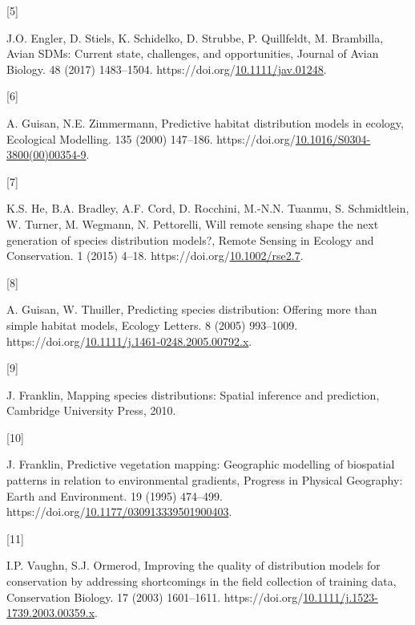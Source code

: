 \documentclass[manuscript, 3p, authoryear]{elsarticle} %
\newlength{\cslhangindent}
\newlength{\csllabelwidth}
\newlength{\cslentryspacingunit} %
\newenvironment{CSLReferences}[2] %
 {%
  \setlength{\parindent}{0pt}
  \ifodd #1
  \let\oldpar\par
  \def\par{\hangindent=\cslhangindent\oldpar}
  \fi
  \setlength{\parskip}{#2\cslentryspacingunit}
 }%
 {}
\newcommand{\CSLLeftMargin}[1]{\parbox[t]{\csllabelwidth}{#1}}
\newcommand{\CSLRightInline}[1]{\parbox[t]{\linewidth - \csllabelwidth}{#1}\break}
\begin{document}
\begin{CSLReferences}{0}{0}
\leavevmode{}%
\CSLLeftMargin{{[}5{]} }%
\CSLRightInline{J.O. Engler, D. Stiels, K. Schidelko, D. Strubbe, P. Quillfeldt, M. Brambilla, Avian {SDMs}: Current state, challenges, and opportunities, Journal of Avian Biology. 48 (2017) 1483--1504. https://doi.org/\href{https://doi.org/10.1111/jav.01248}{10.1111/jav.01248}.}

\leavevmode{}%
\CSLLeftMargin{{[}6{]} }%
\CSLRightInline{A. Guisan, N.E. Zimmermann, Predictive habitat distribution models in ecology, Ecological Modelling. 135 (2000) 147--186. https://doi.org/\href{https://doi.org/10.1016/S0304-3800(00)00354-9}{10.1016/S0304-3800(00)00354-9}.}

\leavevmode{}%
\CSLLeftMargin{{[}7{]} }%
\CSLRightInline{K.S. He, B.A. Bradley, A.F. Cord, D. Rocchini, M.-N.N. Tuanmu, S. Schmidtlein, W. Turner, M. Wegmann, N. Pettorelli, Will remote sensing shape the next generation of species distribution models?, Remote Sensing in Ecology and Conservation. 1 (2015) 4--18. https://doi.org/\href{https://doi.org/10.1002/rse2.7}{10.1002/rse2.7}.}

\leavevmode{}%
\CSLLeftMargin{{[}8{]} }%
\CSLRightInline{A. Guisan, W. Thuiller, Predicting species distribution: Offering more than simple habitat models, Ecology Letters. 8 (2005) 993--1009. https://doi.org/\href{https://doi.org/10.1111/j.1461-0248.2005.00792.x}{10.1111/j.1461-0248.2005.00792.x}.}

\leavevmode{}%
\CSLLeftMargin{{[}9{]} }%
\CSLRightInline{J. Franklin, Mapping species distributions: Spatial inference and prediction, {Cambridge University Press}, 2010.}

\leavevmode{}%
\CSLLeftMargin{{[}10{]} }%
\CSLRightInline{J. Franklin, Predictive vegetation mapping: Geographic modelling of biospatial patterns in relation to environmental gradients, Progress in Physical Geography: Earth and Environment. 19 (1995) 474--499. https://doi.org/\href{https://doi.org/10.1177/030913339501900403}{10.1177/030913339501900403}.}

\leavevmode{}%
\CSLLeftMargin{{[}11{]} }%
\CSLRightInline{I.P. Vaughn, S.J. Ormerod, Improving the quality of distribution models for conservation by addressing shortcomings in the field collection of training data, Conservation Biology. 17 (2003) 1601--1611. https://doi.org/\href{https://doi.org/10.1111/j.1523-1739.2003.00359.x}{10.1111/j.1523-1739.2003.00359.x}.}


\end{CSLReferences}
\end{document}
